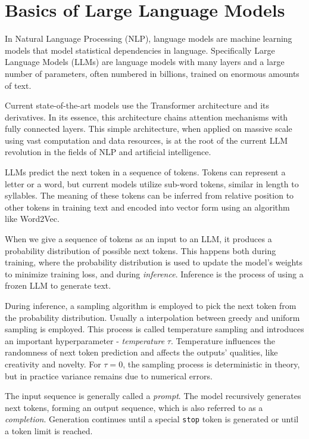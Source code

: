 \section{Basics of Large Language Models}
In Natural Language Processing (NLP), language models are machine learning models that model statistical dependencies in language.
Specifically Large Language Models (LLMs) are language models with many layers and a large number of parameters, often numbered in billions, trained on enormous amounts of text.

Current state-of-the-art models use the Transformer\cite{vaswani2023attentionneed} architecture and its derivatives. 
In its essence, this architecture chains attention mechanisms with fully connected layers. 
This simple architecture, when applied on massive scale using vast computation and data resources, is at the root of the current LLM revolution in the fields of NLP and artificial intelligence.

LLMs predict the next token in a sequence of tokens. Tokens can represent a letter or a word, but current models utilize sub-word tokens, similar in length to syllables.
The meaning of these tokens can be inferred from relative position to other tokens in training text and encoded into vector form using an algorithm like Word2Vec\cite{mikolov2013efficientestimationwordrepresentations}.

When we give a sequence of tokens as an input to an LLM, it produces a probability distribution of possible next tokens. 
This happens both during training, where the probability distribution is used to update the model's weights to minimize training loss, and during \textit{inference}.
Inference is the process of using a frozen LLM to generate text. 

During inference, a sampling algorithm is employed to pick the next token from the probability distribution.
Usually a interpolation between greedy and uniform sampling is employed. This process is called temperature sampling and introduces an important hyperparameter - \textit{temperature} $\tau$.
Temperature influences the randomness of next token prediction and affects the outputs' qualities, like creativity and novelty. 
For $\tau = 0$, the sampling process is deterministic in theory, but in practice variance remains due to numerical errors.

The input sequence is generally called a \textit{prompt}. The model recursively generates next tokens, forming an output sequence, which is also referred to as a \textit{completion}.
Generation continues until a special \texttt{stop} token is generated or until a token limit is reached.

